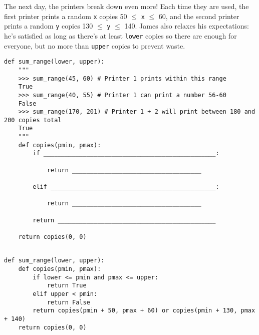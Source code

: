 \begin{blocksection}
\question The next day, the printers break down even more! Each time they are used, the first printer 
prints a random \lstinline$x$ copies 50 $\leq$ \lstinline$x$ $\leq$ 60, and the second printer prints a 
random \lstinline$y$ copies 130 $\leq$ \lstinline$y$ $\leq$ 140. James also relaxes his expectations: he's
satisfied as long as there's at least \lstinline$lower$ copies so there are enough for everyone, but no
more than \lstinline$upper$ copies to prevent waste. \\

\begin{lstlisting}
def sum_range(lower, upper):
    """
    >>> sum_range(45, 60) # Printer 1 prints within this range
    True
    >>> sum_range(40, 55) # Printer 1 can print a number 56-60
    False
    >>> sum_range(170, 201) # Printer 1 + 2 will print between 180 and 200 copies total
    True
    """
    def copies(pmin, pmax):
        if ________________________________________________:
				
            return ____________________________________
						
        elif ______________________________________________:
				
            return ____________________________________
						
        return ____________________________________________
				
    return copies(0, 0)
    
\end{lstlisting}

\begin{solution}[1.5in]
\begin{lstlisting}
def sum_range(lower, upper):
    def copies(pmin, pmax):
        if lower <= pmin and pmax <= upper:
            return True
        elif upper < pmin:
            return False
        return copies(pmin + 50, pmax + 60) or copies(pmin + 130, pmax + 140)
    return copies(0, 0)
\end{lstlisting}
\end{solution}
\end{blocksection}
